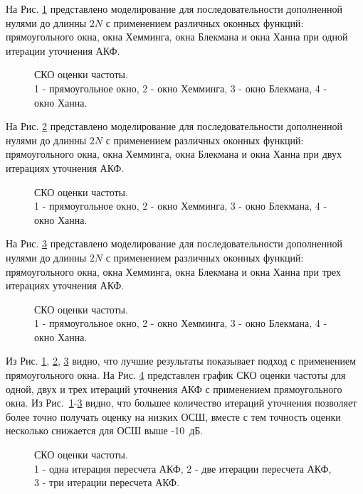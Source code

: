 На Рис. \ref{pic:fft2_1} представлено моделирование для последовательности дополненной нулями до длинны ${2N}$ с применением различных оконных функций:
прямоугольного окна, окна Хемминга, окна Блекмана и окна Ханна при одной итерации уточнения АКФ.
\begin{figure}[h]
	\center{}
	\caption{СКО оценки частоты.\\1 - прямоугольное окно, 2 - окно Хемминга, 3 - окно Блекмана, 4 - окно Ханна.}
	\label{pic:fft2_1}
\end{figure}

На Рис. \ref{pic:fft2_2} представлено моделирование для последовательности дополненной нулями до длинны ${2N}$ с применением различных оконных функций:
прямоугольного окна, окна Хемминга, окна Блекмана и окна Ханна при двух итерациях уточнения АКФ.
\begin{figure}[h]
	\center{}
	\caption{СКО оценки частоты.\\1 - прямоугольное окно, 2 - окно Хемминга, 3 - окно Блекмана, 4 - окно Ханна.}
	\label{pic:fft2_2}
\end{figure}

На Рис. \ref{pic:fft2_3} представлено моделирование для последовательности дополненной нулями до длинны ${2N}$ с применением различных оконных функций:
прямоугольного окна, окна Хемминга, окна Блекмана и окна Ханна при трех итерациях уточнения АКФ.
\begin{figure}[h]
	\center{}
	\caption{СКО оценки частоты.\\1 - прямоугольное окно, 2 - окно Хемминга, 3 - окно Блекмана, 4 - окно Ханна.}
	\label{pic:fft2_3}
\end{figure}

Из Рис. \ref{pic:fft2_1}, \ref{pic:fft2_2}, \ref{pic:fft2_3} видно, что лучшие результаты показывает подход с применением прямоугольного окна. На Рис. \ref{pic:fft2_rect_1_2_3}
представлен график СКО оценки частоты для одной, двух и трех итераций уточнения АКФ с применением прямоугольного окна. Из \mbox{Рис. \ref{pic:fft2_1}-\ref{pic:fft2_3}}  видно, что большее
количество итераций уточнения позволяет более точно получать оценку на низких ОСШ, вместе с тем точность оценки несколько снижается для ОСШ выше \mbox{-10 дБ.}
\begin{figure}[h]
	\center{}
	\caption{СКО оценки частоты.\\1 - одна итерация пересчета АКФ, 2 - две итерации пересчета АКФ, 3 - три итерации пересчета АКФ.}
	\label{pic:fft2_rect_1_2_3}
\end{figure}

